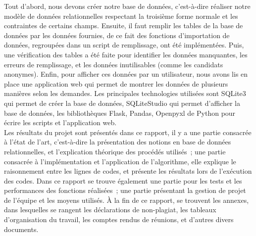 \documentclass[12pt]{article}
\begin{document}
    Tout d'abord, nous devons créer notre base de données, c'est-à-dire réaliser notre modèle de données relationnelles respectant la troisième forme normale et les contraintes de certains champs. Ensuite, il faut remplir les tables de la base de données par les données fournies, de ce fait des fonctions d'importation de données, regroupées dans un script de remplissage, ont été implémentées. Puis, une vérification des tables a été faite pour identifier les données manquantes, les erreurs de remplissage, et les données inutilisables (comme les candidats anonymes). Enfin, pour afficher ces données par un utilisateur, nous avons lis en place une application web qui permet de montrer les données de plusieurs manières selon les demandes. Les principales technologies utilisées sont \textsf{SQLite3} qui permet de créer la base de données, \textsf{SQLiteStudio} qui permet d'afficher la base de données, les bibliothèques \textsf{Flask}, \textsf{Pandas}, \textsf{Openpyxl} de \textsf{Python} pour écrire les scripts et l'application web.\\
    
    Les résultats du projet sont présentés dans ce rapport, il y a une partie consacrée à l'état de l'art, c'est-à-dire la présentation des notions en base de données relationnelles, et l'explication théorique des procédés utilisés~; une partie consacrée à l'implémentation et l'application de l'algorithme, elle explique le raisonnement entre les lignes de codes, et présente les résultats lors de l'exécution des codes. Dans ce rapport se trouve également une partie pour les tests et les performances des fonctions réalisées~; une partie présentant la gestion de projet de l'équipe et les moyens utilisés. À la fin de ce rapport, se trouvent les annexes, dans lesquelles se rangent les déclarations de non-plagiat, les tableaux d'organisation du travail, les comptes rendus de réunions, et d'autres divers documents.

\newpage
\end{document}

